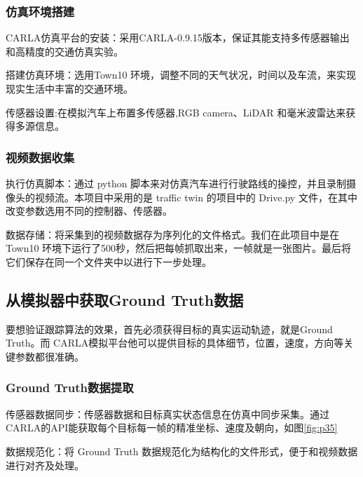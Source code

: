 \subsubsection{仿真环境搭建}

CARLA仿真平台的安装：采用CARLA-0.9.15版本，保证其能支持多传感器输出和高精度的交通仿真实验。

搭建仿真环境：选用Town10 环境，调整不同的天气状况，时间以及车流，来实现现实生活中丰富的交通环境。

传感器设置:在模拟汽车上布置多传感器,RGB  camera、LiDAR 和毫米波雷达来获得多源信息。

\subsubsection{视频数据收集}

执行仿真脚本：通过 python 脚本来对仿真汽车进行行驶路线的操控，并且录制摄像头的视频流。本项目中采用的是 traffic twin 的项目中的 Drive.py 文件，在其中改变参数选用不同的控制器、传感器。


数据存储：将采集到的视频数据存为序列化的文件格式。我们在此项目中是在 Town10 环境下运行了500秒，然后把每帧抓取出来，一帧就是一张图片。最后将它们保存在同一个文件夹中以进行下一步处理。



\subsection{从模拟器中获取Ground Truth数据}

要想验证跟踪算法的效果，首先必须获得目标的真实运动轨迹，就是Ground Truth。而 CARLA模拟平台他可以提供目标的具体细节，位置，速度，方向等关键参数都很准确。


\subsubsection{Ground Truth数据提取}

传感器数据同步：传感器数据和目标真实状态信息在仿真中同步采集。通过CARLA的API能获取每个目标每一帧的精准坐标、速度及朝向，如图\ref{fig:p35}

数据规范化：将 Ground Truth 数据规范化为结构化的文件形式，便于和视频数据进行对齐及处理。





